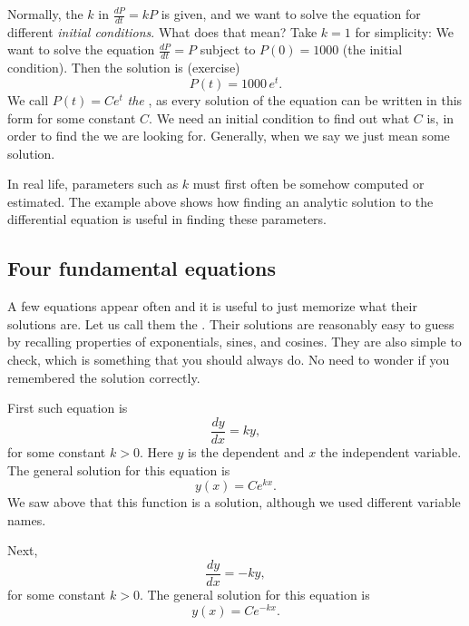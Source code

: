 Normally, the $k$ in $\frac{dP}{dt} = kP$ is given,
and we want to solve
the equation for different \emph{initial conditions}.
What does that mean?
Take $k=1$ for simplicity:  We want to solve the equation
$\frac{dP}{dt} = P$ 
subject to $P(0) = 1000$ (the initial condition).
Then the solution is (exercise)
\begin{equation*}
P(t) = 1000 \, e^t .
\end{equation*}
We call $P(t) = C e^t$ \emph{the },
as every solution
of the equation can be written in this form for some constant $C$.  We
need an initial condition to find out what $C$ is, in order to find the
\emph{} we are looking for.  Generally, when we say
 we just mean some solution.

In real life, parameters such as $k$
must first often be somehow computed or estimated.  The example above
shows how finding an analytic solution to the differential equation
is useful in finding these parameters.

\subsection{Four fundamental equations} \label{subsection:fourfundamental}

A few equations appear often and
it is useful to just memorize what
their solutions are.
Let us call them the .
Their solutions
are reasonably easy
to guess by recalling properties of exponentials, sines, and cosines.
They are also simple to check, which is something that you should always do.
No need to wonder if you remembered the solution correctly.

\medskip

First such equation is
\begin{equation*}
\frac{dy}{dx} = k y ,
\end{equation*}
for some constant $k > 0$.
Here $y$ is the dependent and $x$ the independent variable.
The general solution for this equation is
\begin{equation*}
y(x) = C e^{kx} .
\end{equation*}
We saw above that this function is a solution, although we used different
variable names.

\medskip

Next,
\begin{equation*}
\frac{dy}{dx} = -k y ,
\end{equation*}
for some constant $k > 0$.
The general solution for this equation is
\begin{equation*}
y(x) = C e^{-kx} .
\end{equation*}


